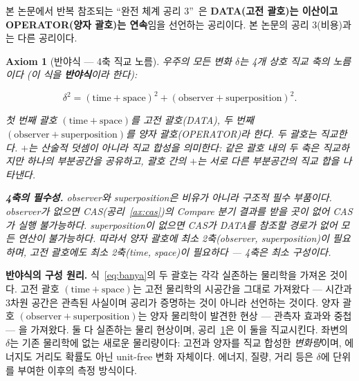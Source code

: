\documentclass[entropy,article,submit,pdftex,oneauthor]{Definitions/mdpi}
\newtheorem{Axiom}{Axiom}
\begin{document}
\noindent 본 논문에서 반복 참조되는 ``완전 체계 공리 3''~\cite{han2026}은 \textbf{DATA(고전 괄호)는 이산이고 OPERATOR(양자 괄호)는 연속}임을 선언하는 공리이다. 본 논문의 공리 3(비용)과는 다른 공리이다.

\begin{Axiom}[반야식 — 4축 직교 노름]\label{ax:banya}
우주의 모든 변화 $\delta$는 4개 상호 직교 축의 노름이다 (이 식을 \textbf{반야식}이라 한다):
\begin{linenomath}
\begin{equation}
\delta^2 = (\mathrm{time} + \mathrm{space})^2 + (\mathrm{observer} + \mathrm{superposition})^2.
\label{eq:banya}
\end{equation}
\end{linenomath}
첫 번째 괄호 $(\mathrm{time} + \mathrm{space})$를 \emph{고전 괄호}(DATA), 두 번째 $(\mathrm{observer} + \mathrm{superposition})$를 \emph{양자 괄호}(OPERATOR)라 한다. 두 괄호는 직교한다. $+$는 산술적 덧셈이 아니라 직교 합성을 의미한다: 같은 괄호 내의 두 축은 직교하지만 하나의 부분공간을 공유하고, 괄호 간의 $+$는 서로 다른 부분공간의 직교 합을 나타낸다.

\textbf{4축의 필수성.} observer와 superposition은 비유가 아니라 구조적 필수 부품이다. observer가 없으면 CAS(공리~\ref{ax:cas})의 Compare 분기 결과를 받을 곳이 없어 CAS가 실행 불가능하다. superposition이 없으면 CAS가 DATA를 참조할 경로가 없어 모든 연산이 불가능하다. 따라서 양자 괄호에 최소 2축(observer, superposition)이 필요하며, 고전 괄호에도 최소 2축(time, space)이 필요하다 --- 4축은 최소 구성이다.
\end{Axiom}

\textbf{반야식의 구성 원리.} 식~\eqref{eq:banya}의 두 괄호는 각각 실존하는 물리학을 가져온 것이다. 고전 괄호 $(\mathrm{time} + \mathrm{space})$는 고전 물리학의 시공간을 그대로 가져왔다 --- 시간과 3차원 공간은 관측된 사실이며 공리가 증명하는 것이 아니라 선언하는 것이다. 양자 괄호 $(\mathrm{observer} + \mathrm{superposition})$는 양자 물리학이 발견한 현상 --- 관측자 효과와 중첩 --- 을 가져왔다. 둘 다 실존하는 물리 현상이며, 공리~\ref{ax:banya}은 이 둘을 직교시킨다. 좌변의 $\delta$는 기존 물리학에 없는 새로운 물리량이다: 고전과 양자를 직교 합성한 \emph{변화량}이며, 에너지도 거리도 확률도 아닌 unit-free 변화 자체이다. 에너지, 질량, 거리 등은 $\delta$에 단위를 부여한 이후의 측정 방식이다.
\end{document}
